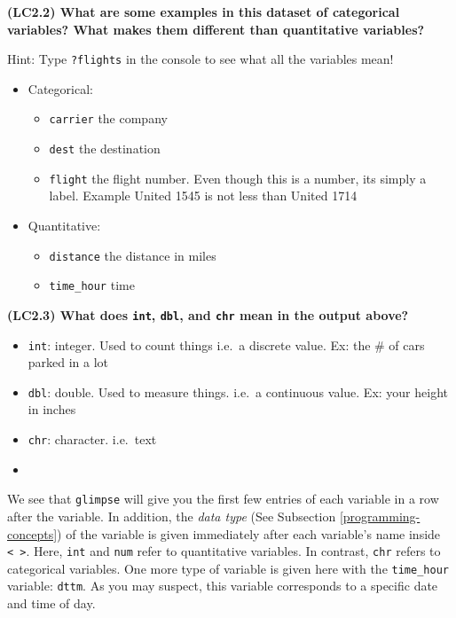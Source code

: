 \documentclass[12pt,]{krantz}
\providecommand{\tightlist}{%
  \setlength{\itemsep}{0pt}\setlength{\parskip}{0pt}}
\newenvironment{rmdblock}[1]
  {\begin{shaded*}
  \begin{itemize}
  \renewcommand{\labelitemi}{
    \raisebox{-.7\height}[0pt][0pt]{
    }
  }
  \item
  }
  {
  \end{itemize}
  \end{shaded*}
  }
\newenvironment{learncheck}
  {\begin{rmdblock}{warning}}
  {\end{rmdblock}}
\begin{document}
\textbf{(LC2.2) What are some examples in this dataset of categorical
variables? What makes them different than quantitative variables?}

Hint: Type \texttt{?flights} in the console to see what all the
variables mean!

\begin{itemize}
\tightlist
\item
  Categorical:

  \begin{itemize}
  \tightlist
  \item
    \texttt{carrier} the company
  \item
    \texttt{dest} the destination
  \item
    \texttt{flight} the flight number. Even though this is a number, its
    simply a label. Example United 1545 is not less than United 1714
  \end{itemize}
\item
  Quantitative:

  \begin{itemize}
  \tightlist
  \item
    \texttt{distance} the distance in miles
  \item
    \texttt{time\_hour} time
  \end{itemize}
\end{itemize}

\textbf{(LC2.3) What does \texttt{int}, \texttt{dbl}, and \texttt{chr}
mean in the output above?}

\begin{itemize}
\tightlist
\item
  \texttt{int}: integer. Used to count things i.e.~a discrete value. Ex:
  the \# of cars parked in a lot
\item
  \texttt{dbl}: double. Used to measure things. i.e.~a continuous value.
  Ex: your height in inches
\item
  \texttt{chr}: character. i.e.~text
\end{itemize}

\begin{learncheck}

\end{learncheck}

We see that \texttt{glimpse} will give you the first few entries of each
variable in a row after the variable. In addition, the \emph{data type}
(See Subsection \ref{programming-concepts}) of the variable is given
immediately after each variable's name inside
\texttt{\textless{}\ \textgreater{}}. Here, \texttt{int} and
\texttt{num} refer to quantitative variables. In contrast, \texttt{chr}
refers to categorical variables. One more type of variable is given here
with the \texttt{time\_hour} variable: \texttt{dttm}. As you may
suspect, this variable corresponds to a specific date and time of day.
\end{document}
